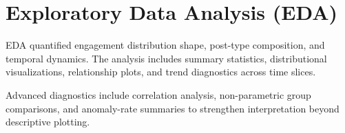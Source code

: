 \section{Exploratory Data Analysis (EDA)}

EDA quantified engagement distribution shape, post-type composition, and temporal dynamics. The analysis includes summary statistics, distributional visualizations, relationship plots, and trend diagnostics across time slices.

Advanced diagnostics include correlation analysis, non-parametric group comparisons, and anomaly-rate summaries to strengthen interpretation beyond descriptive plotting.
